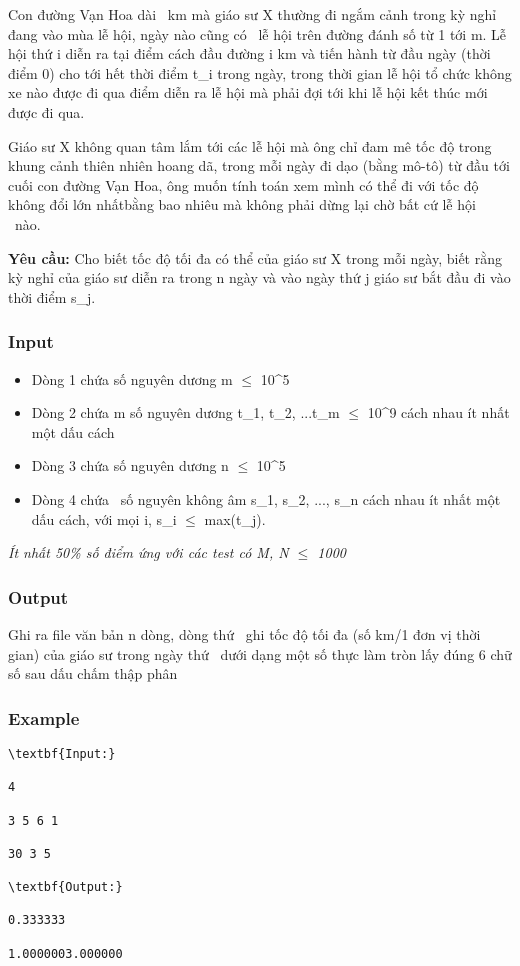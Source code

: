



   Con đường Vạn Hoa dài                                                    km mà giáo sư X thường đi ngắm cảnh trong kỳ nghỉ đang vào mùa lễ hội, ngày nào cũng có     lễ hội trên đường đánh số từ 1 tới m. Lễ hội thứ i diễn ra tại điểm cách đầu đường i km và tiến hành từ đầu ngày (thời điểm 0) cho tới hết thời điểm t\_i trong ngày, trong thời gian lễ hội tổ chức không xe nào được đi qua điểm diễn ra lễ hội mà phải đợi tới khi lễ hội kết thúc mới được đi qua.  

   Giáo sư X không quan tâm lắm tới các lễ hội mà ông chỉ đam mê tốc độ trong khung cảnh thiên nhiên hoang dã, trong mỗi ngày đi dạo (bằng mô-tô) từ đầu tới cuối con đường Vạn Hoa, ông muốn tính toán xem mình có thể đi với tốc độ không đổi lớn nhấtbằng bao nhiêu mà không phải dừng lại chờ bất cứ lễ hội  nào.  

\textbf{    Yêu cầu:   }   Cho biết tốc độ tối đa có thể của giáo sư X trong mỗi ngày, biết rằng kỳ nghỉ của giáo sư diễn ra trong n ngày và vào ngày thứ j giáo sư bắt đầu đi vào thời điểm s\_j.  

\subsubsection{   Input  }
\begin{itemize}
	\item     Dòng 1 chứa số nguyên dương m  $\le$  10\textasciicircum5   
	\item     Dòng 2 chứa m số nguyên dương t\_1, t\_2, ...t\_m  $\le$  10\textasciicircum9 cách nhau ít nhất một dấu cách   
	\item     Dòng 3 chứa số nguyên dương n  $\le$  10\textasciicircum5   
	\item     Dòng 4 chứa     số nguyên không âm s\_1, s\_2, ..., s\_n cách nhau ít nhất một dấu cách, với mọi i, s\_i  $\le$  max(t\_j).   
\end{itemize}

\emph{    Ít nhất 50\% số điểm ứng với các test có M, N  $\le$  1000   }\emph{}

\subsubsection{   Output  }

   Ghi ra file văn bản n dòng, dòng thứ     ghi tốc độ tối đa (số km/1 đơn vị thời gian) của giáo sư trong ngày thứ     dưới dạng một số thực làm tròn lấy đúng 6 chữ số sau dấu chấm thập phân  

\subsubsection{   Example  }
\begin{verbatim}
\textbf{Input:}

4

3 5 6 1

30 3 5

\textbf{Output:}

0.333333

1.0000003.000000\end{verbatim}
